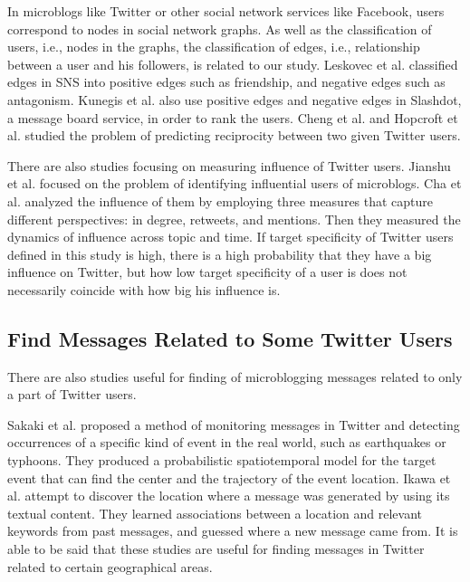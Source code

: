 In microblogs like Twitter or other social network services
like Facebook, users correspond to nodes in social network graphs. As
well as the classification of users, i.e., nodes in the graphs, the
classification of edges, i.e., relationship between a user and his
followers, is related to our study. Leskovec et
al.\cite{leskovec2010predicting,leskovec2010signed} classified edges in
SNS into positive edges such as friendship, and negative edges such as
antagonism. Kunegis et al.\cite{kunegis2009slashdot} also use positive
edges and negative edges in Slashdot, a message board service, in order
to rank the users. Cheng et al.\cite{cheng2011predicting} and Hopcroft
et al.\cite{hopcroft2011will} studied the problem of predicting
reciprocity between two given Twitter users.

There are also studies focusing on measuring influence of Twitter
users.  Jianshu et al.\cite{weng2010twitterrank} focused on the problem of
identifying influential users of microblogs.  Cha et
al.\cite{cha2010measuring} analyzed the influence of them
by employing three measures that capture different perspectives:
in degree, retweets, and mentions.  Then they measured the dynamics of
influence across topic and time.  If target specificity of Twitter users
defined in this study is high, there is a high probability that they
have a big influence on Twitter, but how low target specificity of a
user is does not necessarily coincide with how big his influence is.

\subsection{Find Messages Related to Some Twitter Users}
\label{subsec:Some User}

There are also studies useful for finding of microblogging messages
related to only a part of Twitter users.

Sakaki et al.\cite{sakaki2010earthquake} proposed a method of monitoring
messages in Twitter and detecting occurrences of a specific kind of event
in the real world, such as earthquakes or typhoons.  They produced a
probabilistic spatiotemporal model for the target event that can find
the center and the trajectory of the event location.  Ikawa et
al.\cite{ikawa2012location} attempt to discover the location where a
message was generated by using its textual content.  They learned
associations between a location and relevant keywords from past
messages, and guessed where a new message came from.  It is able to be
said that these studies are useful for finding messages in Twitter
related to certain geographical areas.

